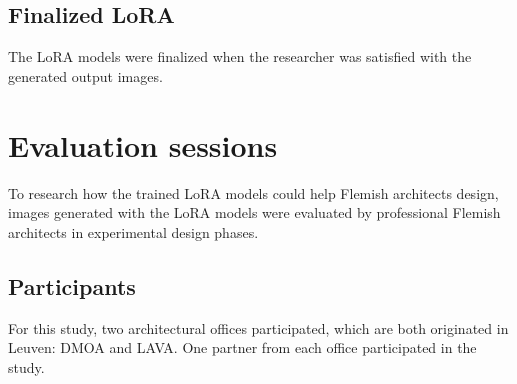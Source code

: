 \subsection{Finalized LoRA}
The LoRA models were finalized when the researcher was satisfied with the generated output images.

\section{Evaluation sessions} \label{sec:Evaluation sessions}
To research how the trained LoRA models could help Flemish architects design, images generated with the LoRA models were evaluated by professional Flemish architects in experimental design phases. 
\subsection{Participants}
For this study, two architectural offices participated, which are both originated in Leuven: DMOA and LAVA. One partner from each office participated in the study. 

